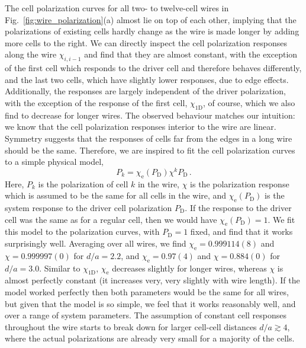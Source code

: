 The cell polarization curves for all two- to twelve-cell wires in
Fig.~\ref{fig:wire_polarization}(a) almost lie on top of each other, implying
that the polarizations of existing cells hardly change as the wire is made
longer by adding more cells to the right. We can directly inspect the cell
polarization responses along the wire $\chi_{i,i-1}$ and find that they are
almost constant, with the exception of the first cell which responds to the
driver cell and therefore behaves differently, and the last two cells, which
have slightly lower responses, due to edge effects. Additionally, the responses
are largely independent of the driver polarization, with the exception of the
response of the first cell, $\chi_{1\text{D}}$, of course, which we also find to
decrease for longer wires. The observed behaviour matches our intuition: we
know that the cell polarization responses interior to the wire are linear.
Symmetry suggests that the responses of cells far from the edges in a long wire
should be the same. Therefore, we are inspired to fit the cell polarization
curves to a simple physical model, 
%
\begin{equation}
  \label{eq:simple_model}
  P_k = \chi_\text{e}(P_\text{D}) \chi^k P_\text{D} \, .
\end{equation}
%
Here, $P_k$ is the polarization of cell $k$ in the wire, $\chi$ is the
polarization response which is assumed to be the same for all cells in the wire,
and $\chi_\text{e}(P_\text{D})$ is the system response to the driver cell polarization $P_\text{D}$.
If the response to the driver cell was the same as for a regular cell, then we
would have $\chi_\text{e}(P_\text{D}) = 1$. We fit this model to the polarization curves, with
$P_\text{D} = 1$ fixed, and find that it works surprisingly well. Averaging over all
wires, we find $\chi_\text{e} = 0.999114(8)$ and $\chi = 0.999997(0)$ for $d/a=2.2$,
and $\chi_\text{e} = 0.97(4)$ and $\chi = 0.884(0)$ for $d/a = 3.0$. Similar to
$\chi_{1\text{D}}$, $\chi_\text{e}$ decreases slightly for longer wires, whereas $\chi$ is
almost perfectly constant (it increases very, very slightly with wire length).
If the model worked perfectly then both parameters would be the same for all
wires, but given that the model is so simple, we feel that it works reasonably
well, and over a range of system parameters. The assumption of constant cell
responses throughout the wire starts to break down for larger cell-cell
distances $d/a \gtrsim 4$, where the actual polarizations are already very small
for a majority of the cells.


